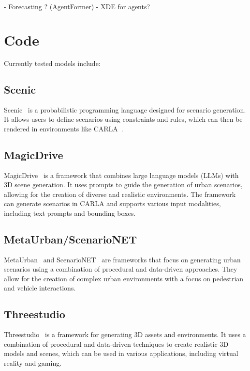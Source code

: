 \documentclass{article}
\begin{document}
\begin{table*}[ht]
- Forecasting ? (AgentFormer)
- XDE for agents?

\section{Code}

Currently tested models include:

\subsection{Scenic}

Scenic~\cite{fremont2019scenic} is a probabilistic programming language designed for scenario generation. It allows users to define scenarios using constraints and rules, which can then be rendered in environments like CARLA~\cite{dosovitskiy2017carla}. 

\subsection{MagicDrive}

MagicDrive~\cite{gao2023magicdrive} is a framework that combines large language models (LLMs) with 3D scene generation. It uses prompts to guide the generation of urban scenarios, allowing for the creation of diverse and realistic environments. The framework can generate scenarios in CARLA and supports various input modalities, including text prompts and bounding boxes.

\subsection{MetaUrban/ScenarioNET}

MetaUrban~\cite{wu2024metaurban} and ScenarioNET~\cite{li2023scenarionet} are frameworks that focus on generating urban scenarios using a combination of procedural and data-driven approaches. They allow for the creation of complex urban environments with a focus on pedestrian and vehicle interactions.

\subsection{Threestudio}

Threestudio~\cite{liu2023threestudio} is a framework for generating 3D assets and environments. It uses a combination of procedural and data-driven techniques to create realistic 3D models and scenes, which can be used in various applications, including virtual reality and gaming.



\end{table*}
\end{document}
